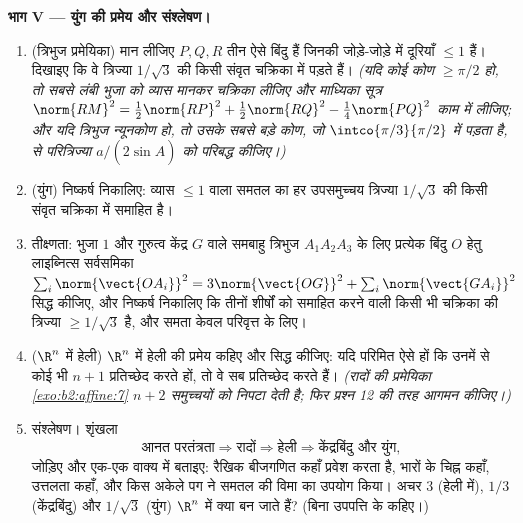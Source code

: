 \begin{problem}
\medskip
\noindent\textbf{भाग V --- युंग की प्रमेय और संश्लेषण।}
\begin{enumerate}[resume]
  \item (त्रिभुज प्रमेयिका) मान लीजिए $P, Q, R$ तीन ऐसे बिंदु हैं जिनकी
        जोड़े-जोड़े में दूरियाँ $\leq 1$ हैं। दिखाइए कि वे त्रिज्या $1/\sqrt3$ की किसी
        संवृत चक्रिका में पड़ते हैं। \emph{(यदि कोई कोण $\geq \pi/2$ हो, तो सबसे
        लंबी भुजा को व्यास मानकर चक्रिका लीजिए और माध्यिका सूत्र $\norm{RM}^2 = \tfrac12\norm{RP}^2 +
        \tfrac12\norm{RQ}^2 - \tfrac14\norm{PQ}^2$ काम
        में लीजिए; और यदि त्रिभुज न्यूनकोण हो, तो उसके सबसे बड़े कोण, जो
        $\intco{\pi/3}{\pi/2}$ में पड़ता है, से परित्रिज्या $a/(2\sin
        \widehat A)$ को परिबद्ध कीजिए।)}
  \item (युंग) निष्कर्ष निकालिए: व्यास $\leq 1$ वाला समतल का हर  उपसमुच्चय
        त्रिज्या $1/\sqrt3$ की किसी संवृत चक्रिका में समाहित है।
  \item तीक्ष्णता: भुजा $1$ और गुरुत्व केंद्र $G$ वाले समबाहु त्रिभुज
        $A_1A_2A_3$ के लिए प्रत्येक बिंदु $O$ हेतु लाइब्नित्स सर्वसमिका $\sum_i \norm{\vect{OA_i}}^2 =
        3\norm{\vect{OG}}^2 + \sum_i \norm{\vect{GA_i}}^2$
        सिद्ध कीजिए, और निष्कर्ष निकालिए कि तीनों शीर्षों को समाहित करने
        वाली किसी भी चक्रिका की त्रिज्या $\geq
        1/\sqrt3$ है, और समता केवल परिवृत्त के
        लिए।
  \item ($\R^n$ में हेली) $\R^n$ में हेली की प्रमेय कहिए और सिद्ध कीजिए: यदि
        परिमित  ऐसे हों कि उनमें से कोई भी $n + 1$ प्रतिच्छेद
        करते हों, तो वे सब प्रतिच्छेद करते हैं। \emph{(रादों की प्रमेयिका
        \cref{exo:b2:affine:7} $n + 2$ समुच्चयों को निपटा देती है; फिर प्रश्न 12 की तरह आगमन
        कीजिए।)}
  \item संश्लेषण। शृंखला
        \[
        \text{आनत परतंत्रता} \Rightarrow \text{रादों}
        \Rightarrow \text{हेली} \Rightarrow
        \text{केंद्रबिंदु और युंग},
        \]
        जोड़िए और एक-एक वाक्य में बताइए: रैखिक बीजगणित कहाँ प्रवेश करता
        है, भारों के चिह्न कहाँ, उत्तलता कहाँ, और किस अकेले पग ने समतल की
        विमा का उपयोग किया। अचर $3$ (हेली में), $1/3$ (केंद्रबिंदु) और
        $1/\sqrt3$ (युंग) $\R^n$ में क्या बन जाते हैं? (बिना उपपत्ति के कहिए।)
\end{enumerate}
\end{problem}
